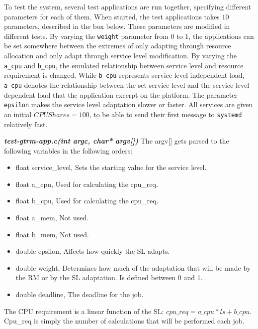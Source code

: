 \documentclass[nobiblatex]{LTHthesis}
\begin{document}
To test the system, several test applications are run together, specifying
different parameters for each of them.%
When started, the test applications takes $10$ parameters, described in 
the box below. These parameters are modified in different tests. By 
varying the \texttt{weight} parameter from $0$ to $1$, the applications can 
be set somewhere between the extremes of only adapting through resource
allocation and only adapt through service level modification.
By varying the \texttt{a\_cpu} and \texttt{b\_cpu}, the emulated relationship
between service level and resource requirement is changed. While
\texttt{b\_cpu} represents service level independent load, \texttt{a\_cpu}
denotes the relationship between the set service level and the service level
dependent load that the application excerpt on the platform. The parameter
\texttt{epsilon} makes the service level adaptation slower or faster. All
services are given an initial $CPUShares = 100$, to be able to send their first message to \texttt{systemd} relatively fast.

\begin{framed}
\begin{flushleft}
	\textbf{\emph{test-gtrm-app.c(int argc, char* argv[])}} \newline
	The argv[] gets parsed to the following variables in the following 
  orders:
	\begin{itemize}
		\item float service\_level, Sets the starting value for the service 
	  level.
		\item float a\_cpu, Used for calculating the cpu\_req.
		\item float b\_cpu, Used for calculating the cpu\_req.
		\item float a\_mem, Not used.
		\item float b\_mem, Not used.
		\item double epsilon, Affects how quickly the SL adapts.
		\item double weight, Determines how much of the adaptation that will 
	  be made by the RM or by the SL adaptation. Is defined between 0 and 1.
		\item double deadline, The deadline for the job.
	\end{itemize}
	The CPU requirement is a linear function of the SL: 
  $cpu\_req = a\_cpu*ls +b\_cpu  $. Cpu\_req is simply the number 
  of calculations that will be performed each job. 
\end{flushleft}
\end{framed}	
\end{document}
